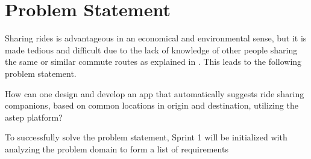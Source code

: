 \section{Problem Statement}\label{sec:probstat}
Sharing rides is advantageous in an economical and environmental sense, but it is made tedious and difficult due to the lack of knowledge of other people sharing the same or similar commute routes as explained in \cite{doi:10.1080/01441647.2011.621557}. This leads to the following problem statement.

{\addtolength{\leftskip}{10mm}\addtolength{\rightskip}{10mm}\noindent\hrulefill\it

\noindent How can one design and develop an app that automatically suggests ride sharing companions, based on common locations in origin and destination, utilizing the \gls{astep} platform? 

\noindent\hrulefill

}

To successfully solve the problem statement, Sprint 1 will be initialized with analyzing the problem domain to form a list of requirements
